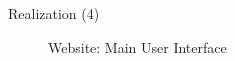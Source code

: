 \documentclass[apectratio=169]{beamer}
\begin{document}
\begin{frame}{Realization (4)}
\begin{figure}
		\caption{Website: Main User Interface}
        \end{figure}
	\end{frame}
 
\end{document}
